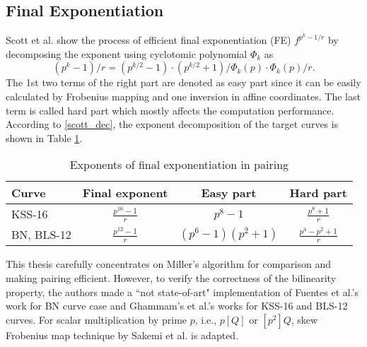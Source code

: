 \subsection{Final Exponentiation}
Scott et al. \cite{PAIRING:SBCDK09a} show the process of efficient final exponentiation (FE) $f^{p^k-1/r}$ by decomposing the exponent using cyclotomic polynomial $\Phi_{k}$ as 
\begin{equation}\label{scott_dec}
(p^k-1)/r = (p^{k/2}-1) \cdot(p^{k/2}+1)/\Phi_{k}(p)\cdot \Phi_{k}(p)/r.
\end{equation}
The 1st two terms of the right part are denoted as easy part since it can be easily calculated by Frobenius mapping and one inversion in affine coordinates. 
The last term is called hard part which mostly affects the computation performance.
According to \eqref{scott_dec}, the exponent decomposition of the target curves is shown in Table \ref{fe_decomp}.
\renewcommand{\baselinestretch}{1.5}
\begin{table}[htb]
\centering
\caption{Exponents of final exponentiation in pairing}
\label{fe_decomp}
\begin{tabular}{l|c|c|c}
\hline
Curve      & \quad Final exponent                \quad  & \quad Easy part    \quad                   &   \quad Hard part     \quad                                        \\ \hline
KSS-16     & \quad $\frac{p^{16}-1}{r}$ \quad & \quad $p^8-1$                           \quad     & \quad $\frac{p^8+1}{r}$      \quad                                         \\ \hline
BN, BLS-12 \quad \quad &  \quad $\frac{p^{12}-1}{r}$ \quad & \quad $(p^6-1)(p^2+1)$ \quad & \quad $\frac{p^4-p^2+1}{r}$  \quad\\
\hline
\end{tabular}
\end{table}
\renewcommand{\baselinestretch}{1.0}

This thesis carefully concentrates on Miller's algorithm for comparison and making pairing efficient. However, to verify the correctness of the bilinearity property,  the authors made a ``not state-of-art" implementation of  Fuentes et al.'s work \cite{SAC:FueKnaRod11} for  BN curve case and  Ghammam's et al.'s works \cite{EPRINT:GhaFou16b,loubna_bls12} for KSS-16 and BLS-12 curves.
For scalar multiplication by prime $p$, i.e., $p[Q]$ or $[p^2]Q$, skew Frobenius map technique by Sakemi et al. \cite{CANS:SNOKM08} is adapted.




